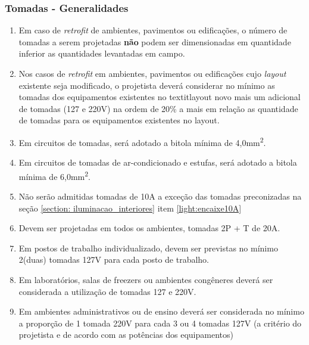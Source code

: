\subsubsection{Tomadas - Generalidades}\label{section: socket-general}

\begin{enumerate}
		
	\item Em caso de \textit{retrofit} de ambientes, pavimentos ou edificações, o número de tomadas a serem projetadas \textbf{não} podem ser dimensionadas em quantidade inferior as quantidades levantadas em campo.
	
	\item Nos casos de \textit{retrofit} em ambientes, pavimentos ou edificações cujo \textit{layout} existente seja modificado, o projetista deverá considerar no mínimo as tomadas dos equipamentos existentes no textit{layout} novo mais um adicional de tomadas (127 e 220V) na ordem de 20\% a mais em relação as quantidade de tomadas para os equipamentos existentes no layout.
	
	\item \label{socket: bitola minima} Em circuitos de tomadas, será adotado a bitola mínima de 4,0mm\textsuperscript{2}.
	
	\item \label{socket: bitola minima ar} Em circuitos de tomadas de ar-condicionado e estufas, será adotado a bitola mínima de 6,0mm\textsuperscript{2}.
	
	\item Não serão admitidas tomadas de 10A a exceção das tomadas preconizadas na seção \ref*{section: iluminacao_interiores} item \ref*{light:encaixe10A}
	
	\item Devem ser projetadas em todos os ambientes, tomadas 2P + T de 20A.
	
	\item Em postos de trabalho individualizado, devem ser previstas no mínimo 2(duas) tomadas 127V para cada posto de trabalho.
	
	\item Em laboratórios, salas de freezers ou ambientes congêneres deverá ser considerada a utilização de tomadas 127 e 220V.
	
	\item Em ambientes administrativos ou de ensino deverá ser considerada no mínimo a proporção de 1 tomada 220V para cada 3 ou 4 tomadas 127V (a critério do projetista e de acordo com as potências dos equipamentos)
	

\end{enumerate}
